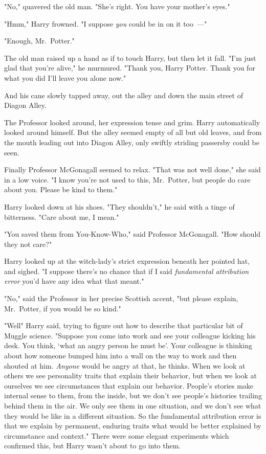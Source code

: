 "No," quavered the old man. "She's right. You have your mother's eyes."

"Hmm," Harry frowned. "I suppose \emph{you} could be in on it too~---"

"Enough, Mr.~Potter."

The old man raised up a hand as if to touch Harry, but then let it fall. "I'm
just glad that you're alive," he murmured. "Thank you, Harry Potter. Thank you
for what you did{\el} I'll leave you alone now."

And his cane slowly tapped away, out the alley and down the main street of
Diagon Alley.

The Professor looked around, her expression tense and grim. Harry automatically
looked around himself. But the alley seemed empty of all but old leaves, and
from the mouth leading out into Diagon Alley, only swiftly striding passersby
could be seen.

Finally Professor McGonagall seemed to relax. "That was not well done," she
said in a low voice. "I know you're not used to this, Mr.~Potter, but people do
care about you. Please be kind to them."

Harry looked down at his shoes. "They shouldn't," he said with a tinge of
bitterness. "Care about me, I mean."

"You saved them from You-Know-Who," said Professor McGonagall. "How should they
not care?"

Harry looked up at the witch-lady's strict expression beneath her pointed hat,
and sighed. "I suppose there's no chance that if I said \emph{fundamental
attribution error} you'd have any idea what that meant."

"No," said the Professor in her precise Scottish accent, "but please explain,
Mr.~Potter, if you would be so kind."

"Well{\el}" Harry said, trying to figure out how to describe that particular
bit of Muggle science. "Suppose you come into work and see your colleague
kicking his desk. You think, `what an angry person he must be'. Your colleague
is thinking about how someone bumped him into a wall on the way to work and
then shouted at him. \emph{Anyone} would be angry at that, he thinks. When we
look at others we see personality traits that explain their behavior, but when
we look at ourselves we see circumstances that explain our behavior. People's
stories make internal sense to them, from the inside, but we don't see people's
histories trailing behind them in the air. We only see them in one situation,
and we don't see what they would be like in a different situation. So the
fundamental attribution error is that we explain by permanent, enduring traits
what would be better explained by circumstance and context." There were some
elegant experiments which confirmed this, but Harry wasn't about to go into
them.

